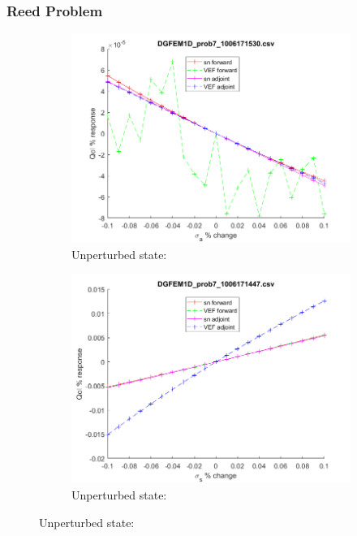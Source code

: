 \documentclass[12pt]{report}
\begin{document}
\subsubsection{Reed Problem}

\begin{figure}[H]
\label{Streaming}
\centering
\begin{subfigure}{.5\textwidth}
  \centering
  \includegraphics[width=.98\linewidth]{figures/7sigaSens.png}
  \caption{Unperturbed state:}
  \label{fig:sfig1}
\end{subfigure}%
\begin{subfigure}{.5\textwidth}
  \centering
  \includegraphics[width=.98\linewidth]{figures/7sigsSens.png}
  \caption{Unperturbed state:}
  \label{fig:sfig4}

\end{subfigure}
\end{figure}
\end{document}

